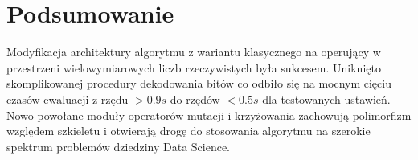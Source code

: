 \documentclass[12pt,a4paper]{article}
\begin{document}
\section{Podsumowanie}
Modyfikacja architektury algorytmu z wariantu klasycznego na operujący w przestrzeni wielowymiarowych liczb rzeczywistych była sukcesem. Uniknięto skomplikowanej procedury dekodowania bitów co odbiło się na mocnym cięciu czasów ewaluacji z rzędu $>0.9s$ do rzędów $<0.5s$ dla testowanych ustawień.
Nowo powołane moduły operatorów mutacji i krzyżowania zachowują polimorfizm względem szkieletu i otwierają drogę do stosowania algorytmu na szerokie spektrum problemów dziedziny Data Science.
\end{document}
